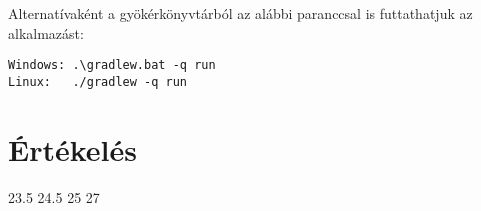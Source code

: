 Alternatívaként a gyökérkönyvtárból az alábbi paranccsal is futtathatjuk az alkalmazást:
\lstset{escapeinside=`', xleftmargin=10pt, frame=single, basicstyle=\ttfamily\footnotesize, language=sh}
\begin{lstlisting}
Windows: .\gradlew.bat -q run
Linux:   ./gradlew -q run
\end{lstlisting}

\section{Értékelés}

\begin{ertekeles}
{23.5}        %
{24.5}
{25}
{27}
\end{ertekeles}

